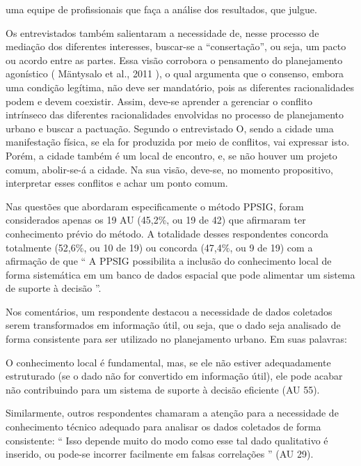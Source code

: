 \documentclass{article}
\begin{document}
						uma equipe de profissionais que faça a análise dos resultados, que
						julgue.

Os entrevistados também salientaram a necessidade de, nesse processo de mediação
					dos diferentes interesses, buscar-se a “consertação”, ou seja, um pacto ou
					acordo entre as partes. Essa visão corrobora o pensamento do planejamento
					agonístico (%
Mäntysalo et al., 2011%
), o
					qual argumenta que o consenso, embora uma condição legítima, não deve ser
					mandatório, pois as diferentes racionalidades podem e devem coexistir. Assim,
					deve-se aprender a gerenciar o conflito intrínseco das diferentes racionalidades
					envolvidas no processo de planejamento urbano e buscar a pactuação. Segundo o
					entrevistado O, sendo a cidade uma manifestação física, se ela for produzida por
					meio de conflitos, vai expressar isto. Porém, a cidade também é um local de
					encontro, e, se não houver um projeto comum, abolir-se-á a cidade. Na sua visão,
					deve-se, no momento propositivo, interpretar esses conflitos e achar um ponto
					comum.

Nas questões que abordaram especificamente o método PPSIG, foram considerados
					apenas os 19 AU (45,2\%, ou 19 de 42) que afirmaram ter conhecimento prévio do
					método. A totalidade desses respondentes concorda totalmente (52,6\%, ou 10 de
					19) ou concorda (47,4\%, ou 9 de 19) com a afirmação de que “%
A PPSIG
						possibilita a inclusão do conhecimento local de forma sistemática em um
						banco de dados espacial que pode alimentar um sistema de suporte à
						decisão%
”.

Nos comentários, um respondente destacou a necessidade de dados coletados serem
					transformados em informação útil, ou seja, que o dado seja analisado de forma
					consistente para ser utilizado no planejamento urbano. Em suas palavras: 

O conhecimento local é fundamental, mas, se ele não estiver adequadamente
						estruturado (se o dado não for convertido em informação útil), ele pode
						acabar não contribuindo para um sistema de suporte à decisão eficiente
(AU 55).%


Similarmente, outros respondentes chamaram a atenção para a necessidade de
					conhecimento técnico adequado para analisar os dados coletados de forma
					consistente: “%
Isso depende muito do modo como esse tal dado qualitativo
						é inserido, ou pode-se incorrer facilmente em falsas correlações%
”
					(AU 29).
\end{document}
